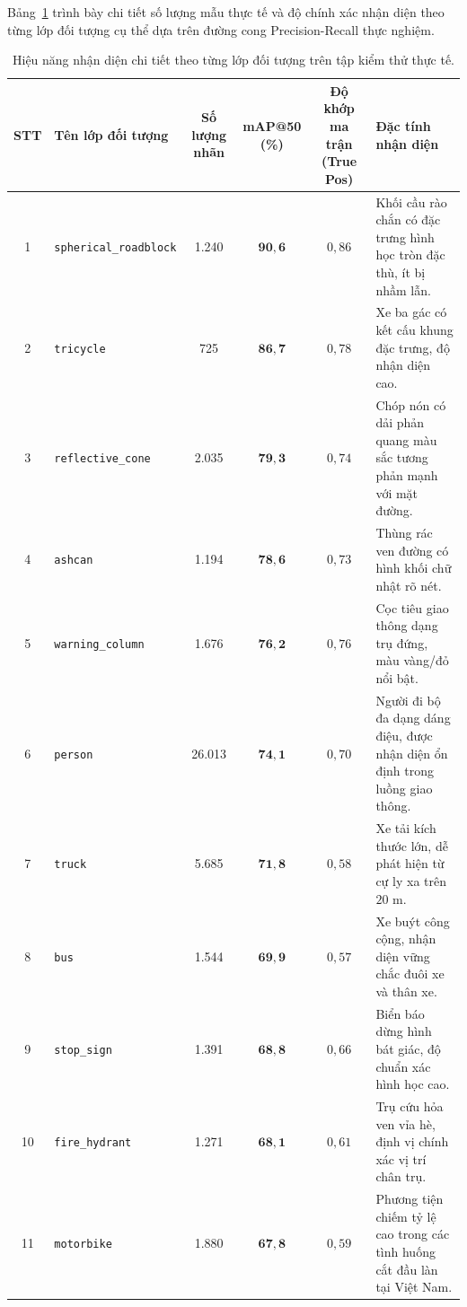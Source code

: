 Bảng~\ref{tab:class_level_metrics} trình bày chi tiết số lượng mẫu thực tế và độ chính xác nhận diện theo từng lớp đối tượng cụ thể dựa trên đường cong Precision-Recall thực nghiệm.

\begin{table}[htbp]
\centering
\caption{Hiệu năng nhận diện chi tiết theo từng lớp đối tượng trên tập kiểm thử thực tế.}
\label{tab:class_level_metrics}
\small
\begin{tabular}{|c|l|c|c|c|p{4.2cm}|}
\hline
\textbf{STT} & \textbf{Tên lớp đối tượng} & \textbf{Số lượng nhãn} & \textbf{mAP@50 (\%)} & \textbf{Độ khớp ma trận (True Pos)} & \textbf{Đặc tính nhận diện} \\ \hline
1 & \texttt{spherical\_roadblock} & 1.240 & $\mathbf{90,6}$ & $0,86$ & Khối cầu rào chắn có đặc trưng hình học tròn đặc thù, ít bị nhầm lẫn. \\ \hline
2 & \texttt{tricycle} & 725 & $\mathbf{86,7}$ & $0,78$ & Xe ba gác có kết cấu khung đặc trưng, độ nhận diện cao. \\ \hline
3 & \texttt{reflective\_cone} & 2.035 & $\mathbf{79,3}$ & $0,74$ & Chóp nón có dải phản quang màu sắc tương phản mạnh với mặt đường. \\ \hline
4 & \texttt{ashcan} & 1.194 & $\mathbf{78,6}$ & $0,73$ & Thùng rác ven đường có hình khối chữ nhật rõ nét. \\ \hline
5 & \texttt{warning\_column} & 1.676 & $\mathbf{76,2}$ & $0,76$ & Cọc tiêu giao thông dạng trụ đứng, màu vàng/đỏ nổi bật. \\ \hline
6 & \texttt{person} & 26.013 & $\mathbf{74,1}$ & $0,70$ & Người đi bộ đa dạng dáng điệu, được nhận diện ổn định trong luồng giao thông. \\ \hline
7 & \texttt{truck} & 5.685 & $\mathbf{71,8}$ & $0,58$ & Xe tải kích thước lớn, dễ phát hiện từ cự ly xa trên $20\text{ m}$. \\ \hline
8 & \texttt{bus} & 1.544 & $\mathbf{69,9}$ & $0,57$ & Xe buýt công cộng, nhận diện vững chắc đuôi xe và thân xe. \\ \hline
9 & \texttt{stop\_sign} & 1.391 & $\mathbf{68,8}$ & $0,66$ & Biển báo dừng hình bát giác, độ chuẩn xác hình học cao. \\ \hline
10 & \texttt{fire\_hydrant} & 1.271 & $\mathbf{68,1}$ & $0,61$ & Trụ cứu hỏa ven vỉa hè, định vị chính xác vị trí chân trụ. \\ \hline
11 & \texttt{motorbike} & 1.880 & $\mathbf{67,8}$ & $0,59$ & Phương tiện chiếm tỷ lệ cao trong các tình huống cắt đầu làn tại Việt Nam. \\ \hline

\end{tabular}
\end{table}
